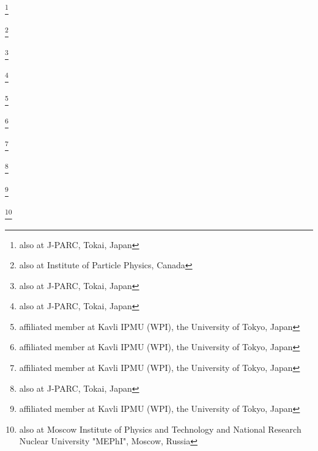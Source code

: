 \documentclass[%
 reprint,
superscriptaddress,
 amsmath,amssymb,
 aps,
]{revtex4-1}
\begin{document}
\author{T.\,Hara}\INSTCC
\author{M.\,Hartz}\INSTHA\INSTB
\author{T.\,Hasegawa}\thanks{also at J-PARC, Tokai, Japan}\INSTCB
\author{N.C.\,Hastings}\INSTE
\author{T.\,Hayashino}\INSTCD
\author{Y.\,Hayato}\INSTBJ\INSTHA
\author{C.\,Hearty}\thanks{also at Institute of Particle Physics, Canada}\INSTD
\author{R.L.\,Helmer}\INSTB
\author{M.\,Hierholzer}\INSTEE
\author{J.\,Hignight}\INSTFJ
\author{A.\,Hillairet}\INSTG
\author{A.\,Himmel}\INSTFH
\author{T.\,Hiraki}\INSTCD
\author{S.\,Hirota}\INSTCD
\author{J.\,Holeczek}\INSTDI
\author{S.\,Horikawa}\INSTEF
\author{F.\,Hosomi}\INSTCH
\author{K.\,Huang}\INSTCD
\author{A.K.\,Ichikawa}\INSTCD
\author{K.\,Ieki}\INSTCD
\author{M.\,Ieva}\INSTED
\author{M.\,Ikeda}\INSTBJ
\author{J.\,Imber}\INSTFJ
\author{J.\,Insler}\INSTFI
\author{T.J.\,Irvine}\INSTCG
\author{T.\,Ishida}\thanks{also at J-PARC, Tokai, Japan}\INSTCB
\author{T.\,Ishii}\thanks{also at J-PARC, Tokai, Japan}\INSTCB
\author{E.\,Iwai}\INSTCB
\author{K.\,Iwamoto}\INSTGD
\author{K.\,Iyogi}\INSTBJ
\author{A.\,Izmaylov}\INSTEC\INSTEB
\author{A.\,Jacob}\INSTGG
\author{B.\,Jamieson}\INSTGH
\author{M.\,Jiang}\INSTCD
\author{S.\,Johnson}\INSTGB
\author{J.H.\,Jo}\INSTFJ
\author{P.\,Jonsson}\INSTEI
\author{C.K.\,Jung}\thanks{affiliated member at Kavli IPMU (WPI), the University of Tokyo, Japan}\INSTFJ
\author{M.\,Kabirnezhad}\INSTDF
\author{A.C.\,Kaboth}\INSTEI
\author{T.\,Kajita}\thanks{affiliated member at Kavli IPMU (WPI), the University of Tokyo, Japan}\INSTCG
\author{H.\,Kakuno}\INSTGI
\author{J.\,Kameda}\INSTBJ
\author{Y.\,Kanazawa}\INSTCH
\author{D.\,Karlen}\INSTG\INSTB
\author{I.\,Karpikov}\INSTEB
\author{T.\,Katori}\INSTFA
\author{E.\,Kearns}\thanks{affiliated member at Kavli IPMU (WPI), the University of Tokyo, Japan}\INSTFE\INSTHA
\author{M.\,Khabibullin}\INSTEB
\author{A.\,Khotjantsev}\INSTEB
\author{D.\,Kielczewska}\INSTDJ
\author{T.\,Kikawa}\INSTCD
\author{A.\,Kilinski}\INSTDF
\author{J.\,Kim}\INSTD
\author{S.\,King}\INSTFA
\author{J.\,Kisiel}\INSTDI
\author{P.\,Kitching}\INSTC
\author{T.\,Kobayashi}\thanks{also at J-PARC, Tokai, Japan}\INSTCB
\author{L.\,Koch}\INSTBC
\author{T.\,Koga}\INSTCH
\author{A.\,Kolaceke}\INSTE
\author{A.\,Konaka}\INSTB
\author{A.\,Kopylov}\INSTEB
\author{L.L.\,Kormos}\INSTEJ
\author{A.\,Korzenev}\INSTEG
\author{Y.\,Koshio}\thanks{affiliated member at Kavli IPMU (WPI), the University of Tokyo, Japan}\INSTGJ
\author{W.\,Kropp}\INSTGA
\author{H.\,Kubo}\INSTCD
\author{Y.\,Kudenko}\thanks{also at Moscow Institute of Physics and Technology and National Research Nuclear University "MEPhI", Moscow, Russia}\INSTEB
\author{R.\,Kurjata}\INSTDH
\end{document}
